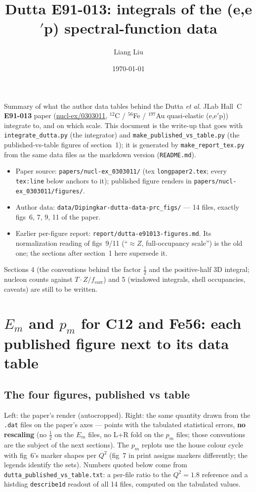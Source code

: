 \documentclass[11pt]{article}
\title{Dutta E91-013: integrals of the (e,e$'$p) spectral-function data}
\author{Liang Liu}
\date{\today}
\begin{document}
\maketitle

Summary of what the author data tables behind the Dutta \emph{et al.} JLab
Hall~C \textbf{E91-013} paper
(\href{https://arxiv.org/abs/nucl-ex/0303011}{nucl-ex/0303011}, \texorpdfstring{$^{12}$C}{C12} /
\texorpdfstring{$^{56}$Fe}{Fe56} / $^{197}$Au quasi-elastic (e,e$'$p)) integrate to, and on which
scale. This document is the write-up that goes with \texttt{integrate\_dutta.py}
(the integrator) and \texttt{make\_published\_vs\_table.py} (the published-vs-table
figures of section~1); it is generated by \texttt{make\_report\_tex.py} from the
same data files as the markdown version (\texttt{README.md}).

\begin{itemize}
\item Paper source: \texttt{papers/nucl-ex\_0303011/} (tex \texttt{longpaper2.tex};
  every \texttt{tex:line} below anchors to it); published figure renders in
  \texttt{papers/nucl-ex\_0303011/figures/}.
\item Author data: \texttt{data/Dipingkar-dutta-data-prc\_figs/} --- 14 files,
  exactly figs~6, 7, 9, 11 of the paper.
\item Earlier per-figure report: \texttt{report/\allowbreak dutta-e91013-figures.md}. Its
  normalization reading of figs~9/11 (``$\approx Z$, full-occupancy scale'')
  is the old one; the sections after section~1 here supersede it.
\end{itemize}

Sections 4 (the conventions behind the factor $\tfrac12$ and the
positive-half 3D integral; nucleon counts against $T \cdot Z / f_\mathrm{corr}$)
and 5 (windowed integrals, shell occupancies, caveats) are still to be
written.

\section{\texorpdfstring{$E_m$ and $p_m$}{Em and pm} for C12 and Fe56: each published figure next to its data table}

\subsection{The four figures, published vs table}

Left: the paper's render (autocropped). Right: the same quantity drawn from
the \texttt{.dat} files on the paper's axes --- points with the tabulated
statistical errors, \textbf{no rescaling} (no $\tfrac12$ on the $E_m$ files,
no L+R fold on the $p_m$ files; those conventions are the subject of the next
sections). The $p_m$ replots use the house colour cycle with fig~6's marker
shapes per $Q^2$ (fig~7 in print assigns markers differently; the legends
identify the sets). Numbers quoted below come from
\texttt{dutta\_published\_vs\_table.txt}: a per-file ratio to the $Q^2 = 1.8$
reference and a histdiag \texttt{describe1d} readout of all 14 files,
computed on the tabulated values.
\end{document}
